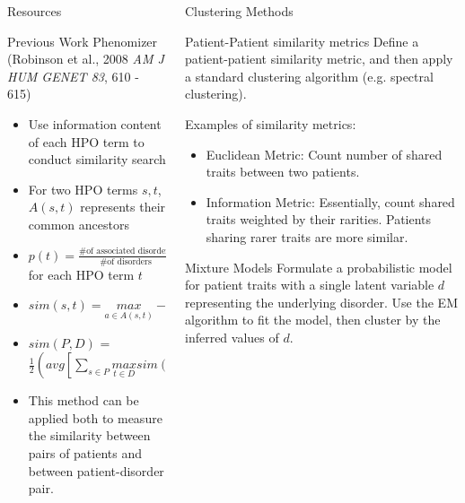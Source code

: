 \documentclass[final]{beamer} %
\begin{document}
\begin{frame}{}
\begin{columns}[T]
\begin{column}{0.3\linewidth}
\begin{block}{\Huge Resources}
   \end{block}

   \begin{block}{\Large Previous Work}
   \Large
   Phenomizer (Robinson et al., 2008 {\it{\Large AM J HUM GENET 83}}, 610 - 615)
   \begin{itemize}
    \item
    Use information content of each HPO term to conduct similarity search
    \item
    For two HPO terms $s, t$, $A(s, t)$ represents their common ancestors
    \item
    $p(t) = \frac{\text{\# of associated disorders}}{\text{\# of disorders}}$ for each HPO term $t$
    \item
    $sim(s, t) = \underset{a \in A(s, t)}{max} -\log p(a)$
    \item
    $sim(P,  D)$ = $\frac{1}{2} ( avg[\sum\limits_{s \in P}
    \underset{t \in D}{max} sim(s, t) ]  +  avg[\sum\limits_{t \in D}
    \underset{s \in P}{max} sim(t, s) ]  ) $ 
    \item
    This method can be applied both to measure the similarity between pairs of patients and between patient-disorder pair.
  \end{itemize}
   \end{block}
    \end{column}

    \begin{column}{0.3\linewidth}
     \begin{block}{\Huge Clustering Methods}
     \Large
		\begin{block}{\Large Patient-Patient similarity metrics}
			Define a patient-patient similarity metric, and then apply a standard clustering algorithm (e.g. spectral clustering).

			Examples of similarity metrics:
			\begin{itemize}
				\item Euclidean Metric: Count number of shared traits between two patients.
				\item Information Metric: Essentially, count shared traits weighted by their rarities. Patients sharing rarer traits are more similar.
			\end{itemize}
		\end{block}
		\begin{block}{\Large Mixture Models}
			Formulate a probabilistic model for patient traits with a single latent variable $d$ representing the underlying disorder. Use the EM algorithm to fit the model, then cluster by the inferred values of $d$.


\end{block}
\end{block}
\end{column}
\end{columns}
\end{frame}
\end{document}
